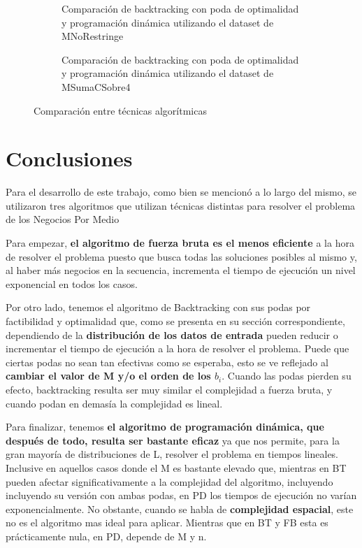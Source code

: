\documentclass[10pt,a4paper]{article}
\begin{document}
\begin{figure}[H]
    \centering
    \begin{subfigure}{0.49\linewidth}
        
        \caption{Comparación de backtracking con poda de optimalidad y programación dinámica utilizando el dataset de MNoRestringe}
        \label{fig:comparacion-bt-o-dp-msinrestriccion}
    \end{subfigure}
    \begin{subfigure}{0.49\linewidth}
        
        \caption{Comparación de backtracking con poda de optimalidad y programación dinámica utilizando el dataset de MSumaCSobre4}
        \label{fig:comparacion-bt-o-dp-msumacsobre4}
    \end{subfigure}
    \caption{Comparación entre técnicas algorítmicas}
\end{figure}

\section{Conclusiones}

Para el desarrollo de este trabajo, como bien se mencionó a lo largo del mismo, se utilizaron tres algoritmos que utilizan técnicas distintas para resolver el problema de los Negocios Por Medio

Para empezar, \textbf{el algoritmo de fuerza bruta es el menos eficiente} a la hora de resolver el problema puesto que busca todas las soluciones posibles al mismo y, al haber más negocios en la secuencia, incrementa el tiempo de ejecución un nivel exponencial en todos los casos.

Por otro lado, tenemos el algoritmo de Backtracking con sus podas por factibilidad y optimalidad que, como se presenta en su sección correspondiente, dependiendo de la \textbf{distribución de los datos de entrada} pueden reducir o incrementar el tiempo de ejecución a la hora de resolver el problema. Puede que ciertas podas no sean tan efectivas como se esperaba, esto se ve reflejado al \textbf{cambiar el valor de M y/o el orden de los $b_i$}. Cuando las podas pierden su efecto, backtracking resulta ser muy similar el complejidad a fuerza bruta, y cuando podan en demasía la complejidad es lineal. 

Para finalizar, tenemos \textbf{el algoritmo de programación dinámica, que después de todo, resulta ser bastante eficaz} ya que nos permite, para la gran mayoría de distribuciones de L, resolver el problema en tiempos lineales. Inclusive en aquellos casos donde el M es bastante elevado que, mientras en BT pueden afectar significativamente a la complejidad del algoritmo, incluyendo incluyendo su versión con ambas podas, en PD los tiempos de ejecución no varían exponencialmente. No obstante, cuando se habla de \textbf{complejidad espacial}, este no es el algoritmo mas ideal para aplicar. Mientras que en BT y FB esta es prácticamente nula, en PD, depende de M y n.
\end{document}
